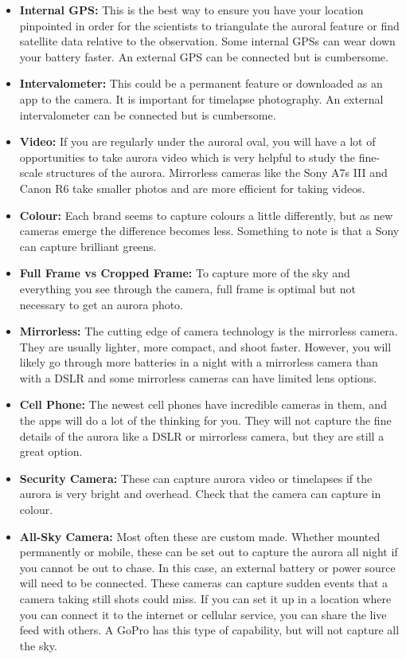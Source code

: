 \documentclass{article}
\begin{document}
\begin{itemize}
\item \textbf{Internal GPS:} This is the best way to ensure you have your location pinpointed in order for the scientists to triangulate the auroral feature or find satellite data relative to the observation. Some internal GPSs can wear down your battery faster. An external GPS can be connected but is cumbersome. 

\item \textbf{Intervalometer:} This could be a permanent feature or downloaded as an app to the camera. It is important for timelapse photography. An external intervalometer can be connected but is cumbersome.

\item \textbf{Video:} If you are regularly under the auroral oval, you will have a lot of opportunities to take aurora video which is very helpful to study the fine-scale structures of the aurora. Mirrorless cameras like the Sony A7s III and Canon R6 take smaller photos and are more efficient for taking videos.

\item \textbf{Colour:} Each brand seems to capture colours a little differently, but as new cameras emerge the difference becomes less. Something to note is that a Sony can capture brilliant greens. 

\item \textbf{Full Frame vs Cropped Frame:} To capture more of the sky and everything you see through the camera, full frame is optimal but not necessary to get an aurora photo.

\item \textbf{Mirrorless:} The cutting edge of camera technology is the mirrorless camera. They are usually lighter, more compact, and shoot faster. However, you will likely go through more batteries in a night with a mirrorless camera than with a DSLR and some mirrorless cameras can have limited lens options.

\item \textbf{Cell Phone:} The newest cell phones have incredible cameras in them, and the apps will do a lot of the thinking for you. They will not capture the fine details of the aurora like a DSLR or mirrorless camera, but they are still a great option.

\item \textbf{Security Camera:} These can capture aurora video or timelapses if the aurora is very bright and overhead. Check that the camera can capture in colour.

\item \textbf{All-Sky Camera:} Most often these are custom made. Whether mounted permanently or mobile, these can be set out to capture the aurora all night if you cannot be out to chase. In this case, an external battery or power source will need to be connected. These cameras can capture sudden events that a camera taking still shots could miss. If you can set it up in a location where you can connect it to the internet or cellular service, you can share the live feed with others. A GoPro has this type of capability, but will not capture all the sky.

\end{itemize}
\end{document}

